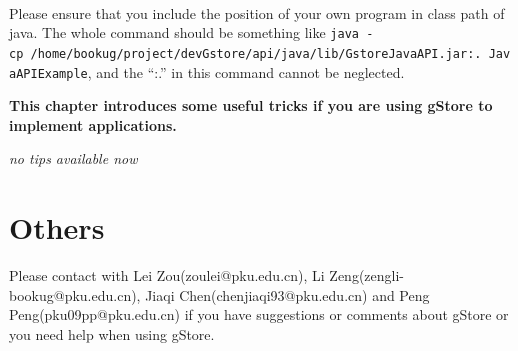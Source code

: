 \documentclass[titlepage, a4paper, 12pt]{article}
\begin{document}
\quad\\
Please ensure that you include the position of your own program in class
path of java. The whole command should be something like
\texttt{java\ -cp\ /home/bookug/project/devGstore/api/java/lib/GstoreJavaAPI.jar:.\ JavaAPIExample},
and the ``:.'' in this command cannot be neglected.

\clearpage
{}

\textbf{This chapter introduces some useful tricks if you are using
gStore to implement applications.}

\emph{no tips available now}

\clearpage

\part{Others}


Please contact with Lei Zou(zoulei@pku.edu.cn), Li Zeng(zengli-bookug@pku.edu.cn), Jiaqi Chen(chenjiaqi93@pku.edu.cn) and Peng Peng(pku09pp@pku.edu.cn) if you have suggestions or comments about gStore or you need help when using gStore.

\end{document}
